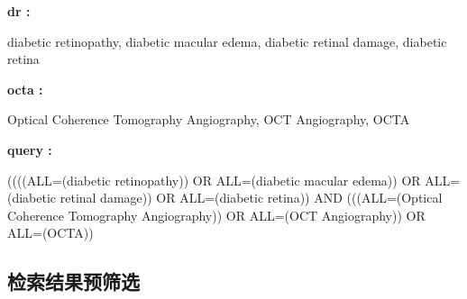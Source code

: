 \documentclass[
]{article}
\begin{document}
\begin{center}\begin{tcolorbox}[colback=gray!10, colframe=gray!50, width=0.9\linewidth, arc=1mm, boxrule=0.5pt]
\textbf{
dr
:}

\vspace{0.5em}

    diabetic retinopathy, diabetic macular edema, diabetic
retinal damage, diabetic retina

\vspace{2em}


\textbf{
octa
:}

\vspace{0.5em}

    Optical Coherence Tomography Angiography, OCT
Angiography, OCTA

\vspace{2em}


\textbf{
query
:}

\vspace{0.5em}

    ((((ALL=(diabetic retinopathy)) OR ALL=(diabetic
macular edema)) OR ALL=(diabetic retinal damage)) OR
ALL=(diabetic retina)) AND (((ALL=(Optical Coherence
Tomography Angiography)) OR ALL=(OCT Angiography)) OR
ALL=(OCTA))

\vspace{2em}
\end{tcolorbox}
\end{center}

\hypertarget{ux68c0ux7d22ux7ed3ux679cux9884ux7b5bux9009}{%
\subsection{检索结果预筛选}\label{ux68c0ux7d22ux7ed3ux679cux9884ux7b5bux9009}}
\end{document}
